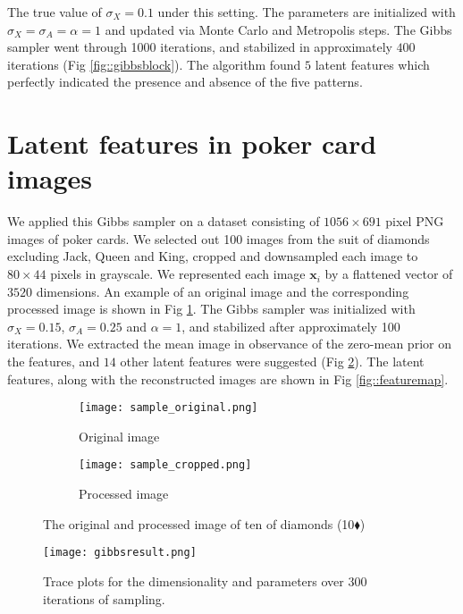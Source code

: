 \documentclass{article}
\begin{document}
The true value of $\sigma_X = 0.1$ under this setting. The parameters are initialized with $\sigma_X = \sigma_A = \alpha = 1$ and updated via Monte Carlo and Metropolis steps. The Gibbs sampler went through 1000 iterations, and stabilized in approximately $400$ iterations (Fig \ref{fig::gibbsblock}). The algorithm found $5$ latent features which perfectly indicated the presence and absence of the five patterns.

\section{Latent features in poker card images}\label{sec::realdata}

We applied this Gibbs sampler on a dataset consisting of $1056\times 691$ pixel PNG images of poker cards. We selected out 100 images from the suit of diamonds excluding Jack, Queen and King, cropped and downsampled each image to $80\times 44$ pixels in grayscale. We represented each image $\boldsymbol{x}_i$ by a flattened vector of $3520$ dimensions. An example of an original image and the corresponding processed image is shown in Fig \ref{fig::sample}. The Gibbs sampler was initialized with $\sigma_X = 0.15$, $\sigma_A = 0.25$ and $\alpha = 1$, and stabilized after approximately 100 iterations. We extracted the mean image in observance of the zero-mean prior on the features, and $14$ other latent features were suggested (Fig \ref{fig::gibbs}). The latent features, along with the reconstructed images are shown in Fig \ref{fig::featuremap}. 

\begin{figure}[!h]
  \centering
  \begin{subfigure}[b]{0.35\textwidth}
    \centering
    \texttt{[image: sample\_original.png]}
    \caption{Original image}
  \end{subfigure} 
  \begin{subfigure}[b]{0.35\textwidth}
    \centering
    \texttt{[image: sample\_cropped.png]}
    \caption{Processed image}
  \end{subfigure}
  \caption{The original and processed image of ten of diamonds (10$\blacklozenge$)}
  \label{fig::sample}
\end{figure}

\begin{figure}[!h]
  \centering
  \texttt{[image: gibbsresult.png]}
  \caption{Trace plots for the dimensionality and parameters over $300$ iterations of sampling.}
  \label{fig::gibbs}
\end{figure}
\end{document}
